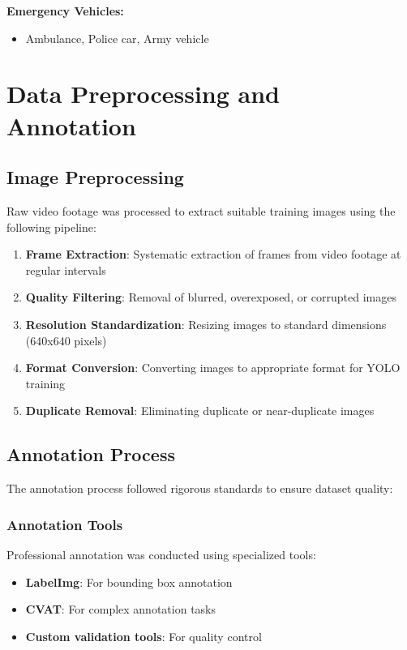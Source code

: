 \textbf{Emergency Vehicles:}
\begin{itemize}
    \item Ambulance, Police car, Army vehicle
\end{itemize}

\section{Data Preprocessing and Annotation}

\subsection{Image Preprocessing}

Raw video footage was processed to extract suitable training images using the following pipeline:

\begin{enumerate}
    \item \textbf{Frame Extraction}: Systematic extraction of frames from video footage at regular intervals
    \item \textbf{Quality Filtering}: Removal of blurred, overexposed, or corrupted images
    \item \textbf{Resolution Standardization}: Resizing images to standard dimensions (640x640 pixels)
    \item \textbf{Format Conversion}: Converting images to appropriate format for YOLO training
    \item \textbf{Duplicate Removal}: Eliminating duplicate or near-duplicate images
\end{enumerate}

\subsection{Annotation Process}

The annotation process followed rigorous standards to ensure dataset quality:

\subsubsection{Annotation Tools}

Professional annotation was conducted using specialized tools:
\begin{itemize}
    \item \textbf{LabelImg}: For bounding box annotation
    \item \textbf{CVAT}: For complex annotation tasks
    \item \textbf{Custom validation tools}: For quality control
\end{itemize}

